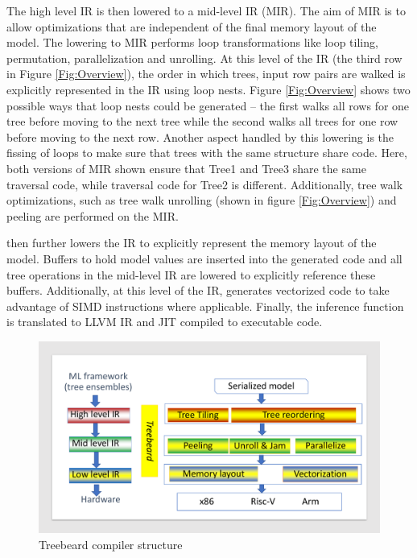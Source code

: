 The high level IR is then lowered to a mid-level IR (MIR). The aim of MIR is 
to allow optimizations that are independent of the final memory layout of the model. 
The lowering to MIR performs loop transformations like loop tiling, permutation, parallelization and unrolling.
At this level of the IR (the third row in Figure \ref{Fig:Overview}),
the order in which trees, input row pairs are walked is explicitly represented in the IR using loop nests.
Figure \ref{Fig:Overview} shows two possible ways that loop nests could be generated -- the first
walks all rows for one tree before moving to the next tree while the second walks all trees for 
one row before moving to the next row. Another aspect handled by this lowering is the fissing of 
loops to make sure that trees with the same structure share code. Here, both versions of MIR shown 
ensure that Tree1 and Tree3 share the same traversal code, while traversal code for Tree2 is different.
Additionally, tree walk optimizations, such as tree walk unrolling (shown in figure \ref{Fig:Overview}) and 
peeling are performed on the MIR.

\Treebeard{} then further lowers the IR to explicitly represent the memory layout of the model. Buffers to hold model 
values are inserted into the generated code and all tree operations in the mid-level IR are lowered to explicitly 
reference these buffers. Additionally, at this level of the IR, \Treebeard{} generates vectorized code to take 
advantage of SIMD instructions where applicable. Finally, the inference function is translated to LLVM IR and 
JIT compiled to executable code. 


\begin{figure}
  \centering
  \includegraphics[width=\linewidth]{figures/compiler.pdf}
  \caption{Treebeard compiler structure}
  \label{Fig:CompilerStructure}
\end{figure}


